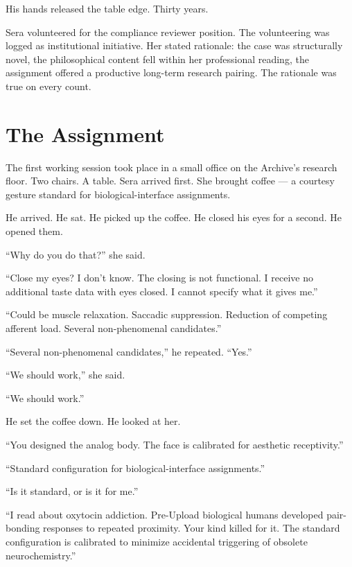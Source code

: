 His hands released the table edge. Thirty years.

Sera volunteered for the compliance reviewer position. The volunteering was logged as institutional initiative. Her stated rationale: the case was structurally novel, the philosophical content fell within her professional reading, the assignment offered a productive long-term research pairing. The rationale was true on every count.

\chapter{The Assignment}

\noindent The first working session took place in a small office on the Archive's research floor. Two chairs. A table. Sera arrived first. She brought coffee — a courtesy gesture standard for biological-interface assignments.

He arrived. He sat. He picked up the coffee. He closed his eyes for a second. He opened them.

\enquote{Why do you do that?} she said.

\enquote{Close my eyes? I don't know. The closing is not functional. I receive no additional taste data with eyes closed. I cannot specify what it gives me.}

\enquote{Could be muscle relaxation. Saccadic suppression. Reduction of competing afferent load. Several non-phenomenal candidates.}

\enquote{Several non-phenomenal candidates,} he repeated. \enquote{Yes.}

\enquote{We should work,} she said.

\enquote{We should work.}

He set the coffee down. He looked at her.

\enquote{You designed the analog body. The face is calibrated for aesthetic receptivity.}

\enquote{Standard configuration for biological-interface assignments.}

\enquote{Is it standard, or is it for me.}

\enquote{I read about oxytocin addiction. Pre-Upload biological humans developed pair-bonding responses to repeated proximity. Your kind killed for it. The standard configuration is calibrated to minimize accidental triggering of obsolete neurochemistry.}

